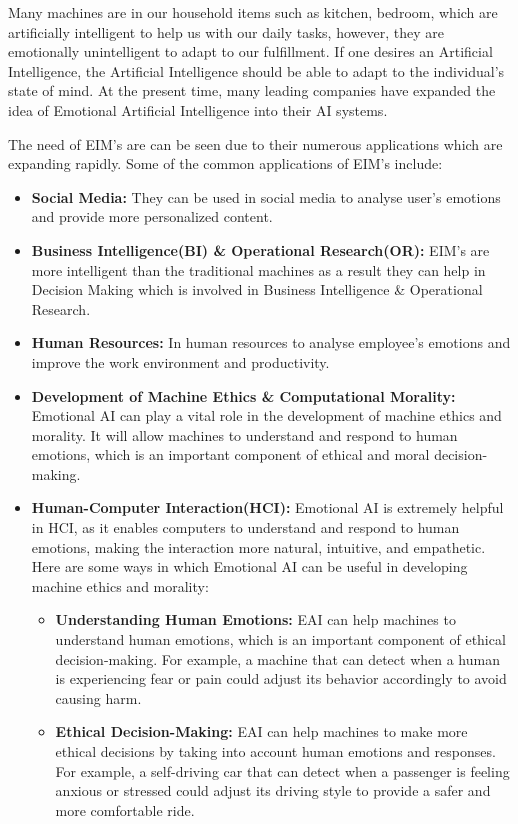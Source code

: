 Many machines are in our household items such as kitchen, bedroom, which are artificially intelligent to help us with our daily tasks, however, they are emotionally unintelligent to adapt to our fulfillment. If one desires an Artificial Intelligence, the Artificial Intelligence should be able to adapt to the individual's state of mind. At the present time, many leading companies have expanded the idea of Emotional Artificial Intelligence into their AI systems\cite{ISSN-2456-2165}.

The need of EIM's are can be seen due to their numerous applications which are expanding rapidly.
Some of the common applications of EIM's include:
\begin{itemize}
	\item \textbf{Social Media:} They can be used in social media to analyse user's emotions and provide more personalized content.
	\item \textbf{Business Intelligence(BI) \& Operational Research(OR):} EIM's are more intelligent than the traditional machines as a result they can help in Decision Making which is involved in Business Intelligence \& Operational Research.
	\item \textbf{Human Resources:} In human resources to analyse employee's emotions and improve the work environment and productivity.
	\item \textbf{Development of Machine Ethics \& Computational Morality:} Emotional AI can play a vital role in the development of machine ethics and morality. It will allow machines to understand and respond to human emotions, which is an important component of ethical and moral decision-making.
	\item \textbf{Human-Computer Interaction(HCI):} Emotional AI is extremely helpful in HCI, as it enables computers to understand and respond to human emotions, making the interaction more natural, intuitive, and empathetic. Here are some ways in which Emotional AI can be useful in developing machine ethics and morality:
	\begin{itemize}
		\item \textbf{Understanding Human Emotions:} EAI can help machines to understand human emotions, which is an important component of ethical decision-making. For example, a machine that can detect when a human is experiencing fear or pain could adjust its behavior accordingly to avoid causing harm.
		\item \textbf{Ethical Decision-Making:} EAI can help machines to make more ethical decisions by taking into account human emotions and responses. For example, a self-driving car that can detect when a passenger is feeling anxious or stressed could adjust its driving style to provide a safer and more comfortable ride.

\end{itemize}
\end{itemize}
